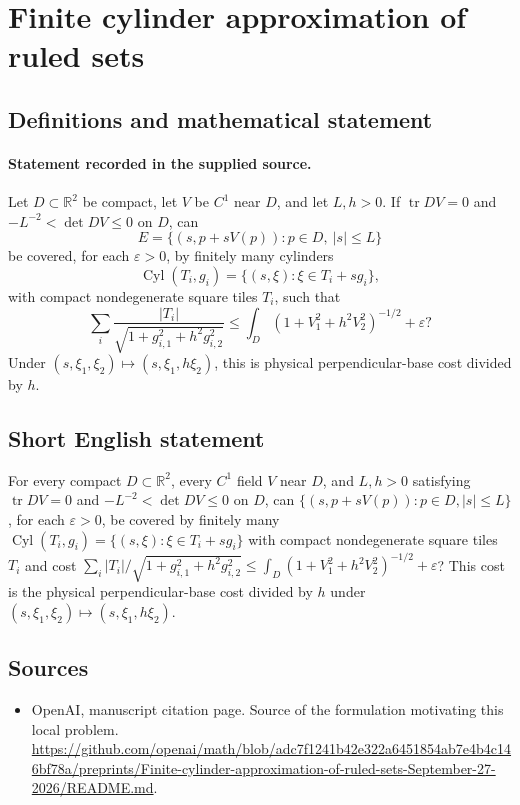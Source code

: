 \documentclass[11pt]{article}
\begin{document}
\section*{Finite cylinder approximation of ruled sets}\label{statement}
\subsection{Definitions and mathematical statement}
\paragraph{Statement recorded in the supplied source.}
Let $D\subset\mathbb{R}^2$ be compact, let $V$ be $C^1$ near $D$, and let $L,h>0$. If $\operatorname{tr}DV=0$ and $-L^{-2}<\det DV\leq0$ on $D$, can
\[
E=\{(s,p+sV(p)):p\in D,\ |s|\leq L\}
\]
be covered, for each $\varepsilon>0$, by finitely many cylinders
\[
\operatorname{Cyl}(T_i,g_i)=\{(s,\xi):\xi\in T_i+sg_i\},
\]
with compact nondegenerate square tiles $T_i$, such that
\[
\sum_i\frac{|T_i|}{\sqrt{1+g_{i,1}^2+h^2g_{i,2}^2}}
\leq\int_D(1+V_1^2+h^2V_2^2)^{-1/2}+\varepsilon?
\]
Under $(s,\xi_1,\xi_2)\mapsto(s,\xi_1,h\xi_2)$, this is physical perpendicular-base cost divided by $h$.
\subsection{Short English statement}
For every compact $D\subset\mathbb{R}^2$, every $C^1$ field $V$ near $D$, and $L,h>0$ satisfying $\operatorname{tr}DV=0$ and $-L^{-2}<\det DV\leq0$ on $D$, can $\{(s,p+sV(p)):p\in D,|s|\leq L\}$, for each $\varepsilon>0$, be covered by finitely many $\operatorname{Cyl}(T_i,g_i)=\{(s,\xi):\xi\in T_i+sg_i\}$ with compact nondegenerate square tiles $T_i$ and cost $\sum_i|T_i|/\sqrt{1+g_{i,1}^2+h^2g_{i,2}^2}\leq\int_D(1+V_1^2+h^2V_2^2)^{-1/2}+\varepsilon$? This cost is the physical perpendicular-base cost divided by $h$ under $(s,\xi_1,\xi_2)\mapsto(s,\xi_1,h\xi_2)$.
\subsection{Sources}
\begin{itemize}
\item[S1] OpenAI, manuscript citation page. Source of the formulation motivating this local problem.
\url{https://github.com/openai/math/blob/adc7f1241b42e322a6451854ab7e4b4c146bf78a/preprints/Finite-cylinder-approximation-of-ruled-sets-September-27-2026/README.md}.
\end{itemize}
\end{document}
